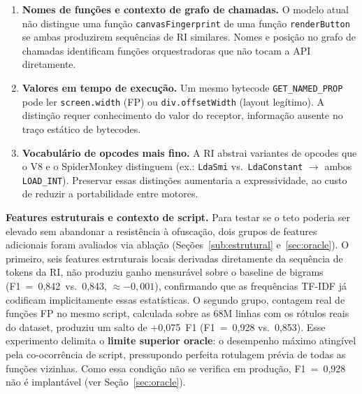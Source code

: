 \begin{enumerate}
\item \textbf{Nomes de funções e contexto de grafo de chamadas.} O modelo atual não
  distingue uma função \texttt{canvasFingerprint} de uma função
  \texttt{renderButton} se ambas produzirem sequências de RI similares. Nomes e
  posição no grafo de chamadas identificam funções orquestradoras que não tocam a
  API diretamente.

\item \textbf{Valores em tempo de execução.} Um mesmo bytecode
  \texttt{GET\_NAMED\_PROP} pode ler \texttt{screen.width} (FP) ou
  \texttt{div.offsetWidth} (layout legítimo). A distinção requer conhecimento do
  valor do receptor, informação ausente no traço estático de bytecodes.

\item \textbf{Vocabulário de opcodes mais fino.} A RI abstrai variantes de opcodes
  que o V8 e o SpiderMonkey distinguem (ex.: \texttt{LdaSmi} vs.\
  \texttt{LdaConstant} $\to$ ambos \texttt{LOAD\_INT}). Preservar essas distinções
  aumentaria a expressividade, ao custo de reduzir a portabilidade entre motores.
\end{enumerate}

\textbf{Features estruturais e contexto de script.} Para testar se o teto poderia
ser elevado sem abandonar a resistência à ofuscação, dois grupos de features
adicionais foram avaliados via ablação (Seções~\ref{sub:estrutural}
e~\ref{sec:oracle}). O primeiro, seis features estruturais locais derivadas
diretamente da sequência de tokens da RI, não produziu ganho mensurável sobre
o baseline de bigrams (F1~=~0,842~vs.~0,843, $\approx{-}0{,}001$), confirmando que as frequências
TF-IDF já codificam implicitamente essas estatísticas. O segundo grupo, contagem
real de funções FP no mesmo script, calculada sobre as 68M linhas com os rótulos
reais do dataset, produziu um salto de +0,075~F1 (F1~=~0,928
vs.~0,853). Esse experimento delimita o \textbf{limite superior oracle}:
o desempenho máximo atingível pela co-ocorrência de script, pressupondo perfeita
rotulagem prévia de todas as funções vizinhas. Como essa condição não se verifica
em produção, F1~=~0,928 não é implantável (ver Seção~\ref{sec:oracle}).

